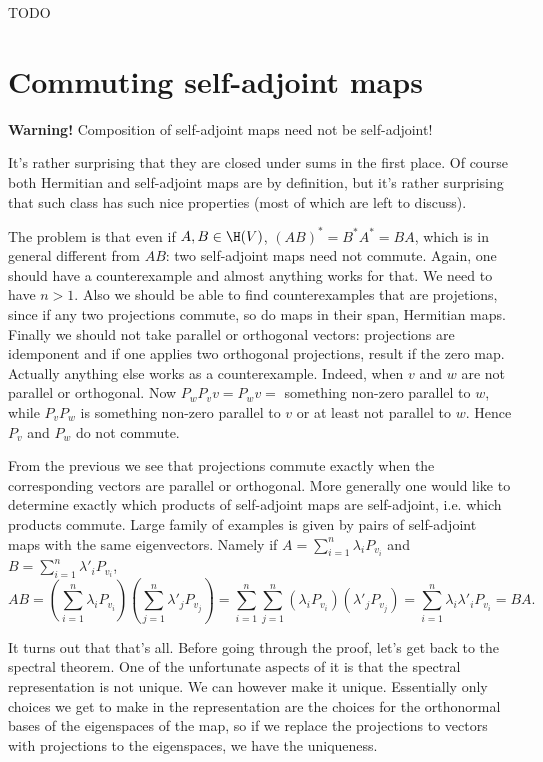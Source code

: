 TODO

\section{Commuting self-adjoint maps}

\textbf{Warning!} Composition of self-adjoint maps need not be self-adjoint!

It's rather surprising that they are closed under sums in the first place. Of course both Hermitian and self-adjoint maps are by definition, but it's rather surprising that such class has such nice properties (most of which are left to discuss).

The problem is that even if $A, B \in \H(V)$, $(AB)^{*} = B^{*} A^{*} = B A$, which is in general different from $A B$: two self-adjoint maps need not commute. Again, one should have a counterexample and almost anything works for that. We need to have $n > 1$. Also we should be able to find counterexamples that are projetions, since if any two projections commute, so do maps in their span, Hermitian maps. Finally we should not take parallel or orthogonal vectors: projections are idemponent and if one applies two orthogonal projections, result if the zero map. Actually anything else works as a counterexample. Indeed, when $v$ and $w$ are not parallel or orthogonal. Now $P_{w} P_{v} v = P_{w} v =$ something non-zero parallel to $w$, while $P_{v} P_{w}$ is something non-zero parallel to $v$ or at least not parallel to $w$. Hence $P_{v}$ and $P_{w}$ do not commute.

From the previous we see that projections commute exactly when the corresponding vectors are parallel or orthogonal. More generally one would like to determine exactly which products of self-adjoint maps are self-adjoint, i.e. which products commute. Large family of examples is given by pairs of self-adjoint maps with the same eigenvectors. Namely if $A = \sum_{i = 1}^{n} \lambda_{i} P_{v_{i}}$ and $B = \sum_{i = 1}^{n} \lambda'_{i} P_{v_{i}}$,
\[
	A B = \left(\sum_{i = 1}^{n} \lambda_{i} P_{v_{i}} \right) \left(\sum_{j = 1}^{n} \lambda'_{j} P_{v_{j}}\right) = \sum_{i = 1}^{n} \sum_{j = 1}^{n}\left(\lambda_{i} P_{v_{i}}\right)\left(\lambda'_{j} P_{v_{j}}\right) = \sum_{i = 1}^{n}\lambda_{i}\lambda'_{i} P_{v_{i}} = BA.
\]

It turns out that that's all. Before going through the proof, let's get back to the spectral theorem. One of the unfortunate aspects of it is that the spectral representation is not unique. We can however make it unique. Essentially only choices we get to make in the representation are the choices for the orthonormal bases of the eigenspaces of the map, so if we replace the projections to vectors with projections to the eigenspaces, we have the uniqueness.

